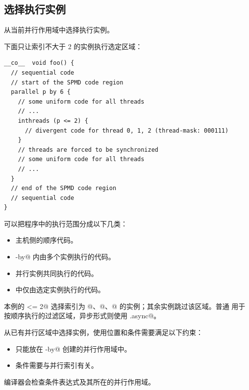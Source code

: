 \subsection*{选择执行实例}

\co@inthreads@ 从当前并行作用域中选择执行实例。

下面只让索引不大于 2 的实例执行选定区域：

\begin{lstlisting}[language=croqtile,caption={tileflow 程序的并行视角}]
__co__  void foo() {
  // sequential code
  // start of the SPMD code region
  parallel p by 6 {
    // some uniform code for all threads
    // ...
    inthreads (p <= 2) {
      // divergent code for thread 0, 1, 2 (thread-mask: 000111)
    }
    // threads are forced to be synchronized
    // some uniform code for all threads
    // ...
  }
  // end of the SPMD code region
  // sequential code
}
\end{lstlisting}

可以把程序中的执行范围分成以下几类：

\begin{itemize}[leftmargin=1.6em]
\item 主机侧的顺序代码。
\item \co@parallel-by@ 内由多个实例执行的代码。
\item 并行实例共同执行的代码。
\item \co@inthreads@ 中仅由选定实例执行的代码。
\end{itemize}

本例的 \co@p <= 2@ 选择索引为 @、@、@ 的实例；其余实例跳过该区域。普通 \co@inthreads@ 用于按顺序执行的过滤区域，异步形式则使用 \co@.async@。

\co@inthreads@ 从已有并行区域中选择实例，使用位置和条件需要满足以下约束：

\begin{itemize}[leftmargin=1.6em]
\item 只能放在 \co@parallel-by@ 创建的并行作用域中。
\item 条件需要与并行索引有关。
\end{itemize}

编译器会检查条件表达式及其所在的并行作用域。
